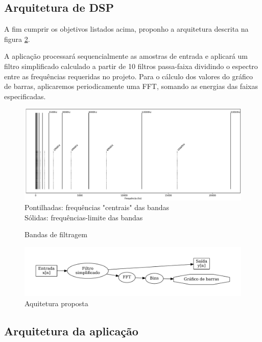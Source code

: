 
\subsection{Arquitetura de DSP}

A fim cumprir os objetivos listados acima, proponho a arquitetura descrita na figura \ref{fig:arquitetura}.

A aplicação processará sequencialmente as amostras de entrada e aplicará um filtro simplificado calculado a partir de 10 filtros passa-faixa dividindo o espectro entre as frequências requeridas no projeto. Para o cálculo dos valores do gráfico de barras, aplicaremos periodicamente uma FFT, somando as energias das faixas especificadas.

\begin{figure}[h]
    \centering
    \includegraphics[scale=.45]{fig/Bands.pdf}\\
    \small{Pontilhadas: frequências "centrais" das bandas}\\
    \small{Sólidas: frequências-limite das bandas}
    \caption{Bandas de filtragem}
    \label{fig:bandas}
\end{figure}

\begin{figure}[h]
    \centering
    \includegraphics[scale=0.5]{fig/arquiteturafft.pdf}
    \caption{Aquitetura proposta}
    \label{fig:arquitetura}
\end{figure}
\break
\subsection{Arquitetura da aplicação}



